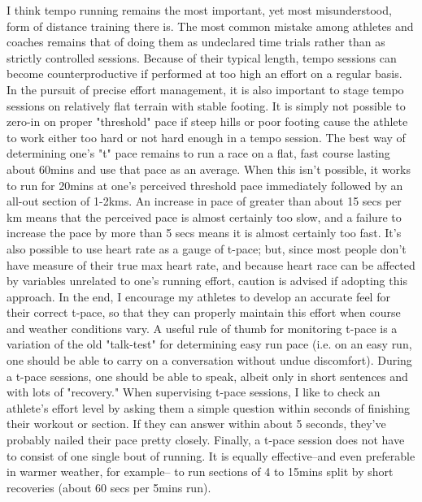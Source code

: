 I think tempo running remains the most important, yet most misunderstood, form of distance training there is. The most common mistake among athletes and coaches remains that of doing them as undeclared time trials rather than as strictly controlled sessions. Because of their typical length, tempo sessions can become counterproductive if performed at too high an effort on a regular basis. In the pursuit of precise effort management, it is also important to stage tempo sessions on relatively flat terrain with stable footing. It is simply not possible to zero-in on proper "threshold" pace if steep hills or poor footing cause the athlete to work either too hard or not hard enough in a tempo session. The best way of determining one's "t" pace remains to run a race on a flat, fast course lasting about 60mins and use that pace as an average. When this isn't possible, it works to run for 20mins at one's perceived threshold pace immediately followed by an all-out section of 1-2kms. An increase in pace of greater than about 15 secs per km means that the perceived pace is almost certainly too slow, and a failure to increase the pace by more than 5 secs means it is almost certainly too fast. It's also possible to use heart rate as a gauge of t-pace; but, since most people don't have measure of their true max heart rate, and because heart race can be affected by variables unrelated to one's running effort, caution is advised if adopting this approach. In the end, I encourage my athletes to develop an accurate feel for their correct t-pace, so that they can properly maintain this effort when course and weather conditions vary. A useful rule of thumb for monitoring t-pace is a variation of the old "talk-test" for determining easy run pace (i.e. on an easy run, one should be able to carry on a conversation without undue discomfort). During a t-pace sessions, one should be able to speak, albeit only in short sentences and with lots of "recovery." When supervising t-pace sessions, I like to check an athlete's effort level by asking them a simple question within seconds of finishing their workout or section. If they can answer within about 5 seconds, they've probably nailed their pace pretty closely. Finally, a t-pace session does not have to consist of one single bout of running. It is equally effective--and even preferable in warmer weather, for example-- to run sections of 4 to 15mins split by short recoveries (about 60 secs per 5mins run).




